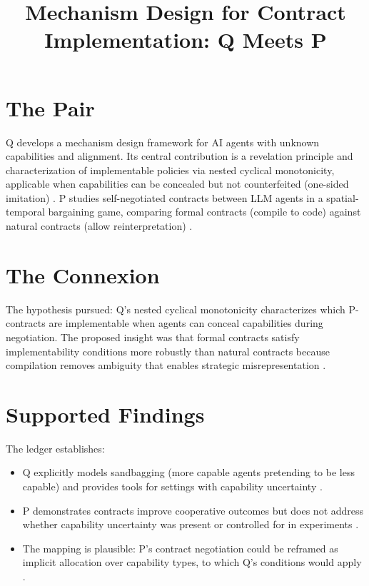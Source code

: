 \documentclass{article}
\title{Mechanism Design for Contract Implementation: Q Meets P}
\begin{document}
\maketitle

\section*{The Pair}

Q develops a mechanism design framework for AI agents with unknown capabilities and alignment. Its central contribution is a revelation principle and characterization of implementable policies via nested cyclical monotonicity, applicable when capabilities can be concealed but not counterfeited (one-sided imitation) . P studies self-negotiated contracts between LLM agents in a spatial-temporal bargaining game, comparing formal contracts (compile to code) against natural contracts (allow reinterpretation) .

\section*{The Connexion}

The hypothesis pursued: Q's nested cyclical monotonicity characterizes which P-contracts are implementable when agents can conceal capabilities during negotiation. The proposed insight was that formal contracts satisfy implementability conditions more robustly than natural contracts because compilation removes ambiguity that enables strategic misrepresentation .

\section*{Supported Findings}

The ledger establishes:

\begin{itemize}
    \item Q explicitly models sandbagging (more capable agents pretending to be less capable) and provides tools for settings with capability uncertainty .
    \item P demonstrates contracts improve cooperative outcomes but does not address whether capability uncertainty was present or controlled for in experiments .
    \item The mapping is plausible: P's contract negotiation could be reframed as implicit allocation over capability types, to which Q's conditions would apply .
\end{itemize}
\end{document}
